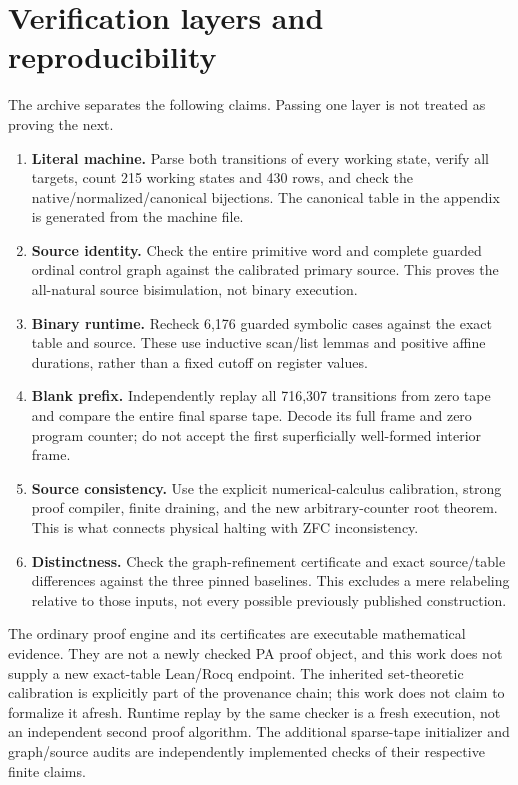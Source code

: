 \section{Verification layers and reproducibility}
The archive separates the following claims. Passing one layer is not treated as proving the next.
\begin{enumerate}
\item \textbf{Literal machine.} Parse both transitions of every working state, verify all targets, count 215 working states and 430 rows, and check the native/normalized/canonical bijections. The canonical table in the appendix is generated from the machine file.
\item \textbf{Source identity.} Check the entire primitive word and complete guarded ordinal control graph against the calibrated primary source. This proves the all-natural source bisimulation, not binary execution.
\item \textbf{Binary runtime.} Recheck 6,176 guarded symbolic cases against the exact table and source. These use inductive scan/list lemmas and positive affine durations, rather than a fixed cutoff on register values.
\item \textbf{Blank prefix.} Independently replay all 716,307 transitions from zero tape and compare the entire final sparse tape. Decode its full frame and zero program counter; do not accept the first superficially well-formed interior frame.
\item \textbf{Source consistency.} Use the explicit numerical-calculus calibration, strong proof compiler, finite draining, and the new arbitrary-counter root theorem. This is what connects physical halting with ZFC inconsistency.
\item \textbf{Distinctness.} Check the graph-refinement certificate and exact source/table differences against the three pinned baselines. This excludes a mere relabeling relative to those inputs, not every possible previously published construction.
\end{enumerate}

The ordinary proof engine and its certificates are executable mathematical evidence. They are not a newly checked PA proof object, and this work does not supply a new exact-table Lean/Rocq endpoint. The inherited set-theoretic calibration is explicitly part of the provenance chain; this work does not claim to formalize it afresh. Runtime replay by the same checker is a fresh execution, not an independent second proof algorithm. The additional sparse-tape initializer and graph/source audits are independently implemented checks of their respective finite claims.

